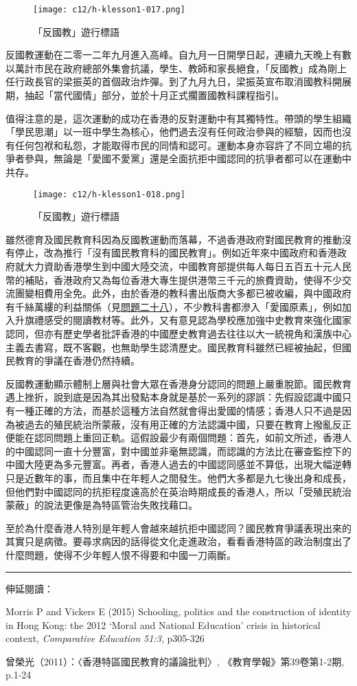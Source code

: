 \begin{figure}[htbp]
    \centering
    \texttt{[image: c12/h-klesson1-017.png]}
    \caption{「反國教」遊行標語} 
\end{figure}

反國教運動在二零一二年九月進入高峰。自九月一日開學日起，連續九天晚上有數以萬計市民在政府總部外集會抗議，學生、教師和家長絕食，「反國教」成為剛上任行政長官的梁振英的首個政治炸彈。到了九月九日，梁振英宣布取消國教科開展期，抽起「當代國情」部分，並於十月正式擱置國教科課程指引。

值得注意的是，這次運動的成功在香港的反對運動中有其獨特性。帶頭的學生組織「學民思潮」以一班中學生為核心，他們過去沒有任何政治參與的經驗，因而也沒有任何包袱和私怨，才能取得市民的同情和認可。運動本身亦容許了不同立場的抗爭者參與，無論是「愛國不愛黨」還是全面抗拒中國認同的抗爭者都可以在運動中共存。

\begin{figure}[htbp]
    \centering
    \texttt{[image: c12/h-klesson1-018.png]}
    \caption{「反國教」遊行標語} 
\end{figure}

雖然德育及國民教育科因為反國教運動而落幕，不過香港政府對國民教育的推動沒有停止，改為推行「沒有國民教育科的國民教育」。例如近年來中國政府和香港政府就大力資助香港學生到中國大陸交流，中國教育部提供每人每日五百五十元人民幣的補貼，香港政府又為每位香港大專生提供港幣三千元的旅費資助，使得不少交流團變相費用全免。此外，由於香港的教科書出版商大多都已被收編，與中國政府有千絲萬縷的利益關係（見\hyperref[sec:sec28]{問題二十八}），不少教科書都滲入「愛國原素」，例如加入升旗禮感受的閱讀教材等。此外，又有意見認為學校應加強中史教育來強化國家認同，但亦有歷史學者批評香港的中國歷史教育過去往往以大一統視角和漢族中心主義去書寫，既不客觀，也無助學生認清歷史。國民教育科雖然已經被抽起，但國民教育的爭議在香港仍然持續。

反國教運動顯示體制上層與社會大眾在香港身分認同的問題上嚴重脫節。國民教育遇上挫折，說到底是因為其出發點本身就是基於一系列的謬誤：先假設認識中國只有一種正確的方法，而基於這種方法自然就會得出愛國的情感；香港人只不過是因為被過去的殖民統治所蒙蔽，沒有用正確的方法認識中國，只要在教育上撥亂反正便能在認同問題上重回正軌。這假設最少有兩個問題：首先，如前文所述，香港人的中國認同一直十分豐富，對中國並非毫無認識，而認識的方法比在審查監控下的中國大陸更為多元豐富。再者，香港人過去的中國認同感並不算低，出現大幅逆轉只是近數年的事，而且集中在年輕人之間發生。他們大多都是九七後出身和成長，但他們對中國認同的抗拒程度遠高於在英治時期成長的香港人，所以「受殖民統治蒙蔽」的說法更像是為特區管治失敗找藉口。

至於為什麼香港人特別是年輕人會越來越抗拒中國認同？國民教育爭議表現出來的其實只是病徵。要尋求病因的話得從文化走進政治，看看香港特區的政治制度出了什麼問題，使得不少年輕人恨不得要和中國一刀兩斷。

\rule[-10pt]{15cm}{0.05em}

伸延閱讀：

Morris P and Vickers E (2015) Schooling, politics and the construction of identity in Hong Kong: the 2012 ‘Moral and National Education’ crisis in historical context, \textit{Comparative Education 51:3}, p305-326

曾榮光（2011）：〈香港特區國民教育的議論批判〉, 《教育學報》第39卷第1-2期, p.1-24